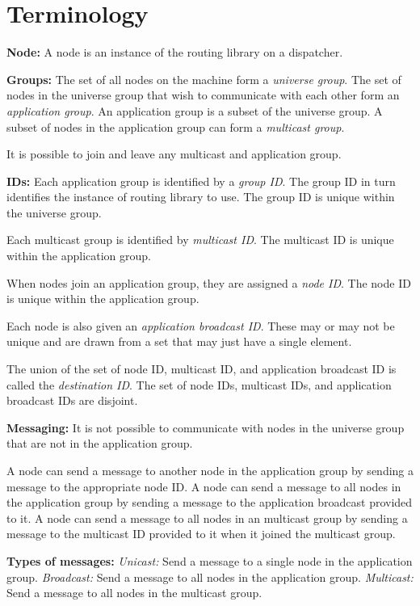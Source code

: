 \documentclass[a4paper,twoside]{report} %
\begin{document}
\section{Terminology}

\textbf{Node:}
A node is an instance of the routing library on a dispatcher.

\textbf{Groups:}
The set of all nodes on the machine form a \emph{universe group}.
The set of nodes in the universe group that
wish to communicate with each other form an \emph{application group}.
An application group is a subset of the universe group.
A subset of nodes in the application group can form a \emph{multicast group}.

It is possible to join and leave any multicast and application group.

\textbf{IDs:}
Each application group is identified by a \emph{group ID}.
The group ID in turn identifies the instance of routing library to use.
The group ID is unique within the universe group.

Each multicast group is identified by \emph{multicast ID}.
The multicast ID is unique within the application group.

When nodes join an application group, they are assigned a \emph{node ID}.
The node ID is unique within the application group.

Each node is also given an \emph{application broadcast ID}.
These may or may not be unique and are drawn from a set that
may just have a single element.

The union of the set of node ID, multicast ID, and application broadcast ID is
called the \emph{destination ID}.
The set of node IDs, multicast IDs, and application broadcast IDs are disjoint.

\textbf{Messaging:}
It is not possible to communicate with nodes in the universe group that
are not in the application group.

A node can send a message to another node in the application group by
sending a message to the appropriate node ID.
A node can send a message to all nodes in the application group by
sending a message to the application broadcast provided to it.
A node can send a message to all nodes in an multicast group by
sending a message to the multicast ID provided to it
when it joined the multicast group.

\textbf{Types of messages:}
\emph{Unicast:} Send a message to a single node in the application group.
\emph{Broadcast:} Send a message to all nodes in the application group.
\emph{Multicast:} Send a message to all nodes in the multicast group.
\end{document}
